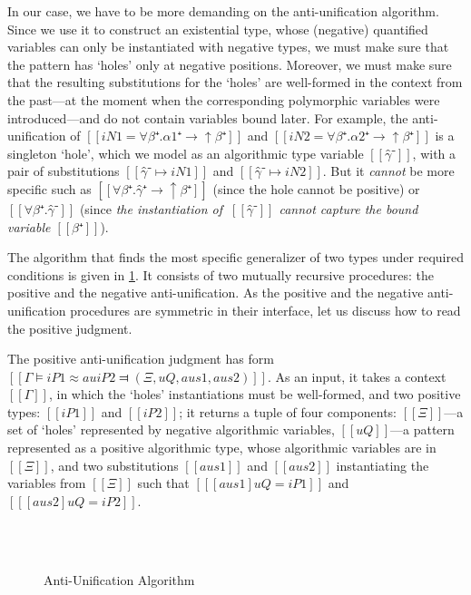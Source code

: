 In our case, we have to be more demanding on the anti-unification algorithm.
Since we use it to construct an existential type, whose (negative) quantified
variables can only be instantiated with negative types, we must make sure that
the pattern has `holes' only at negative positions. Moreover, we must make sure
that the resulting substitutions for the `holes' are well-formed in the context
from the past---at the moment when the corresponding polymorphic variables were
introduced---and do not contain variables bound later. For example, the
anti-unification of $[[iN1 = ∀β⁺.α1⁺ → ↑β⁺]]$ and $[[iN2 = ∀β⁺.α2⁺ → ↑β⁺]]$ is a
singleton `hole', which we model as an algorithmic type variable $[[γ̂⁻]]$, with
a pair of substitutions $[[γ̂⁻ ↦ iN1]]$ and $[[γ̂⁻ ↦ iN2]]$. But it
\emph{cannot} be more specific such as $[[∀β⁺.γ̂⁺ → ↑β⁺]]$ (since the hole
cannot be positive) or $[[∀β⁺.γ̂⁻]]$ (since \emph{the instantiation of $~[[γ̂⁻]]$ cannot capture the
bound variable $[[β⁺]]$}).

The algorithm that finds the most specific generalizer of two types
under required conditions is given in \cref{fig:anti-unification}.
It consists of two mutually recursive procedures:
the positive and the negative anti-unification. 
As the positive and the negative anti-unification procedures
are symmetric in their interface, let us discuss how to read
the positive judgment. 

The positive anti-unification judgment has form
$[[Γ ⊨ iP1 ≈au iP2 ⫤ ( Ξ , uQ , aus1 , aus2 )]]$.
As an input, it takes a context $[[Γ]]$, in which the `holes'
instantiations must be well-formed, 
and two positive types: $[[iP1]]$ and $[[iP2]]$;
it returns a tuple of four components:
$[[Ξ]]$---a set of `holes' represented by negative algorithmic variables,
$[[uQ]]$---a pattern represented as a positive algorithmic type,
whose algorithmic variables are in $[[Ξ]]$,
and two substitutions $[[aus1]]$ and $[[aus2]]$
instantiating the variables from $[[Ξ]]$ such that
$[[ [aus1]uQ = iP1 ]]$ and $[[ [aus2]uQ = iP2 ]]$. 

\begin{figure}[h]
    \ottdefnAUAUPLabeled{}
    \hfill\\
    \hfill\\
    \ottdefnAUAUNLabeled{}
    \caption{Anti-Unification Algorithm}
    \label{fig:anti-unification}
\end{figure}

